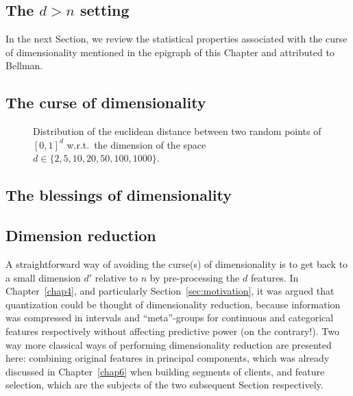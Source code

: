 \subsection{The $d > n$ setting}

In the next Section, we review the statistical properties associated with the curse of dimensionality mentioned in the epigraph of this Chapter and attributed to Bellman.

\subsection{The curse of dimensionality}



\begin{figure}[!ht]
\centering
\resizebox{\textwidth}{!}{}
\caption{Distribution of the euclidean distance between two random points of $[0,1]^d$ w.r.t.\ the dimension of the space $d \in \{ 2, 5, 10, 20, 50, 100, 1000 \}$.}
\label{fig:distance}
\end{figure}

\subsection{The blessings of dimensionality}


\subsection{Dimension reduction}

A straightforward way of avoiding the curse(s) of dimensionality is to get back to a small dimension $d'$ relative to $n$ by pre-processing the $d$ features. In Chapter~\ref{chap4}, and particularly Section~\ref{sec:motivation}, it was argued that quantization could be thought of dimensionality reduction, because information was compressed in intervals and ``meta''-groups for continuous and categorical features respectively without affecting predictive power (on the contrary!). Two way more classical ways of performing dimensionality reduction are presented here: combining original features in principal components, which was already discussed in Chapter~\ref{chap6} when building segments of clients, and feature selection, which are the subjects of the two subsequent Section respectively.

